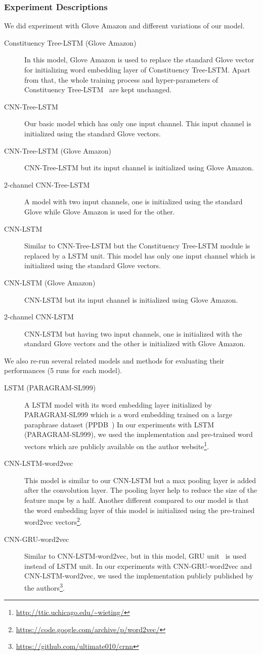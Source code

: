 \subsubsection{Experiment Descriptions}
We did experiment with Glove Amazon and different variations of our model.
\begin{description}
	\item[Constituency Tree-LSTM (Glove Amazon)] In this model, Glove Amazon is used to replace the standard Glove vector for initializing word embedding layer of Constituency Tree-LSTM.
	Apart from that, the whole training process and hyper-parameters of Constituency Tree-LSTM~\cite{treeLSTM} are kept unchanged.
	\item[CNN-Tree-LSTM] Our basic model which has only one input channel. 
	This input channel is initialized using the standard Glove vectors.
	\item[CNN-Tree-LSTM (Glove Amazon)] CNN-Tree-LSTM but its input channel is initialized using Glove Amazon.
	\item [2-channel CNN-Tree-LSTM] A model with two input channels, one is initialized using the standard Glove while Glove Amazon is used for the other.
	\item[CNN-LSTM] Similar to CNN-Tree-LSTM but the Constituency Tree-LSTM module is replaced by a LSTM unit.
	This model has only one input channel which is initialized using the standard Glove vectors.
	\item [CNN-LSTM (Glove Amazon)] CNN-LSTM but its input channel is initialized using Glove Amazon.
	\item [2-channel CNN-LSTM] CNN-LSTM but having two input channels, one is initialized with the standard Glove vectors and the other is initialized with Glove Amazon.
\end{description}
We also re-run several related models and methods for evaluating their performances (5 runs for each model).
\begin{description}
	\item[LSTM (PARAGRAM-SL999)~\cite{wieting2015towards}] A LSTM model with its word embedding layer initialized by PARAGRAM-SL999 which is a word embedding trained on a large paraphrase dataset (PPDB~\cite{ganitkevitch2013ppdb})
	In our experiments with LSTM (PARAGRAM-SL999), we used the implementation and pre-trained word vectors which are publicly available on the author website\footnote{\url{http://ttic.uchicago.edu/~wieting/}}.
	\item [CNN-LSTM-word2vec~\cite{cnn-rnn}] This model is similar to our CNN-LSTM but a max pooling layer is added after the convolution layer.  
	The pooling layer help to reduce the size of the feature maps by a half.
	Another different compared to our model is that the word embedding layer of this model is initialized using the pre-trained word2vec vectors\footnote{\url{https://code.google.com/archive/p/word2vec/}}.
	\item [CNN-GRU-word2vec~\cite{cnn-rnn}] Similar to CNN-LSTM-word2vec, but in this model, GRU unit~\cite{gru} is used instead of LSTM unit.
	In our experiments with CNN-GRU-word2vec and CNN-LSTM-word2vec, we used the implementation publicly published by the authors\footnote{\url{https://github.com/ultimate010/crnn}}.
\end{description}
